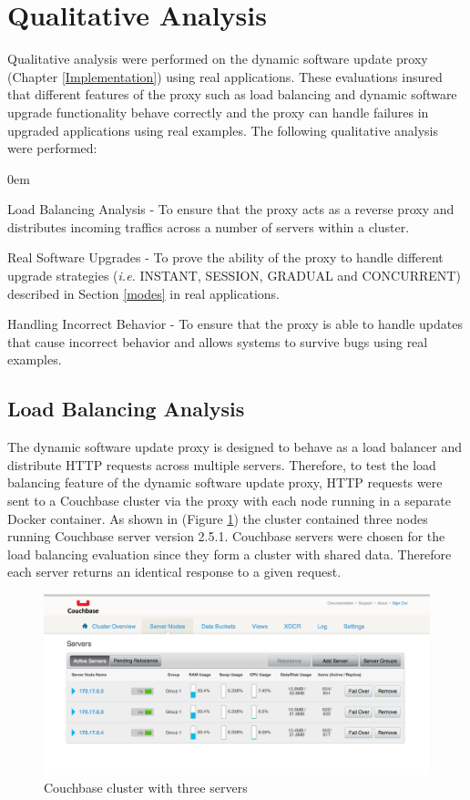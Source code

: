 \documentclass[a4paper,11pt,twoside]{report}
\begin{document}
\section{Qualitative Analysis}
Qualitative analysis were performed on the dynamic software update proxy (Chapter \ref{Implementation})  using real applications. These evaluations insured that different features of the proxy such as load balancing and dynamic software upgrade functionality behave correctly and the proxy can handle failures in upgraded applications using real examples. The following qualitative analysis were performed: 

\begin{list}{-}{}
  \itemsep0em
  \item{Load Balancing Analysis} - To ensure that the proxy acts as a reverse proxy and distributes incoming traffics across a number of servers within a cluster. 

  \item{Real Software Upgrades} - To prove the ability of the proxy to handle different upgrade strategies (\textit{i.e.} INSTANT, SESSION, GRADUAL and CONCURRENT) described in Section \ref{modes} in real applications. 
  
   \item{Handling Incorrect Behavior} - To ensure that the proxy is able to handle updates that cause incorrect behavior and allows systems to survive bugs using real examples. 
\end{list} 

\subsection{Load Balancing Analysis}
The dynamic software update proxy is designed to behave as a load balancer and distribute  HTTP requests across multiple servers. Therefore, to test the load balancing feature of the dynamic software update proxy, HTTP requests were sent to a Couchbase cluster via the proxy with each node running in a separate Docker container. As shown in (Figure \ref{couchbase_cluster}) the cluster contained three nodes running Couchbase server version 2.5.1.  Couchbase servers were chosen for the load balancing evaluation since they form a cluster with shared data. Therefore each server returns an identical response to a given request.

\begin{figure}[!ht]
  \centering
     \includegraphics[scale=0.40]{couchbase_cluster}
  \caption{Couchbase cluster with three servers}
  \label{couchbase_cluster}
\end{figure} 
\end{document}
